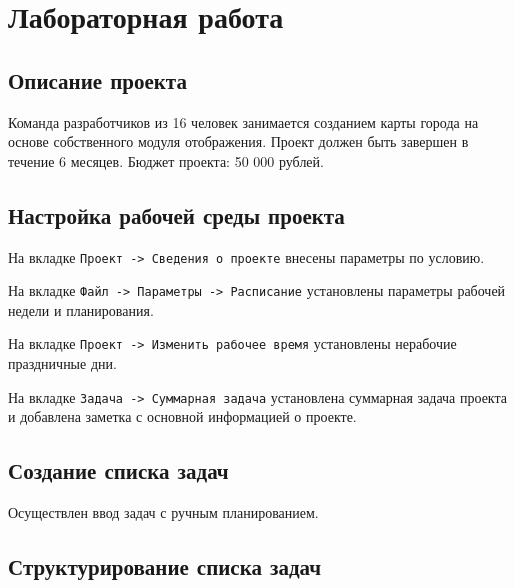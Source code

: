 \chapter{Лабораторная работа}

\section{Описание проекта}

Команда разработчиков из 16 человек занимается созданием карты города на основе собственного модуля отображения. Проект должен быть завершен в течение 6 месяцев. Бюджет проекта: 50 000 рублей.

\section{Настройка рабочей среды проекта}

На вкладке \texttt{Проект -> Сведения о проекте} внесены параметры по условию.


На вкладке \texttt{Файл -> Параметры -> Расписание} установлены параметры рабочей недели и планирования.


На вкладке \texttt{Проект -> Изменить рабочее время} установлены нерабочие праздничные дни.


На вкладке \texttt{Задача -> Суммарная задача} установлена суммарная задача проекта и добавлена заметка с основной информацией о проекте.


\clearpage

\section{Создание списка задач}

Осуществлен ввод задач с ручным планированием.


\section{Структурирование списка задач}


